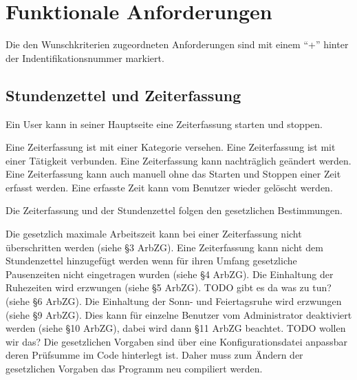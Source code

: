 \section{Funktionale Anforderungen}

Die den Wunschkriterien zugeordneten Anforderungen sind mit einem "`+"' hinter der Indentifikationsnummer markiert.

\subsection{Stundenzettel und Zeiterfassung}

\begin{requirements}
    Ein User kann in seiner Hauptseite eine Zeiterfassung starten und stoppen.
    \begin{requirements}
         Eine Zeiterfassung ist mit einer Kategorie versehen.
         Eine Zeiterfassung ist mit einer Tätigkeit verbunden.
         Eine Zeiterfassung kann nachträglich geändert werden.
         Eine Zeiterfassung kann auch manuell ohne das Starten und Stoppen einer Zeit erfasst werden.
         Eine erfasste Zeit kann vom Benutzer wieder gelöscht werden.
    \end{requirements}

    Die Zeiterfassung und der Stundenzettel folgen den gesetzlichen Bestimmungen.
    \begin{requirements}
         Die gesetzlich maximale Arbeitszeit kann bei einer Zeiterfassung nicht überschritten werden (siehe §3 ArbZG).
         Eine Zeiterfassung kann nicht dem Stundenzettel hinzugefügt werden wenn für ihren Umfang gesetzliche Pausenzeiten nicht eingetragen wurden (siehe §4 ArbZG).
         Die Einhaltung der Ruhezeiten wird erzwungen (siehe §5 ArbZG).
         TODO gibt es da was zu tun? (siehe §6 ArbZG).
         Die Einhaltung der Sonn- und Feiertagsruhe wird erzwungen (siehe §9 ArbZG).
                Dies kann für einzelne Benutzer vom Administrator deaktiviert werden (siehe §10 ArbZG), dabei wird dann §11 ArbZG beachtet. TODO wollen wir das?
         Die gesetzlichen Vorgaben sind über eine Konfigurationsdatei anpassbar deren Prüfsumme im Code hinterlegt ist.
                Daher muss zum Ändern der gesetzlichen Vorgaben das Programm neu compiliert werden.
    \end{requirements}


\end{requirements}
